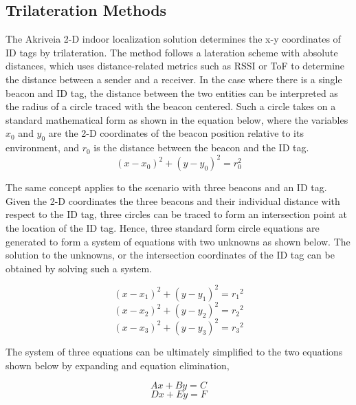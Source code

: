\pagebreak
\subsection{Trilateration Methods}
\medskip
The Akriveia 2-D indoor localization solution determines the x-y coordinates of ID tags by trilateration. The method follows a lateration scheme with absolute distances, which uses distance-related metrics such as RSSI or ToF to determine the distance between a sender and a receiver. In the case where there is a single beacon and ID tag, the distance between the two entities can be interpreted as the radius of a circle traced with the beacon centered. Such a circle takes on a standard mathematical form as shown in the equation below, where the variables $x_0$ and $y_0$ are the 2-D coordinates of the beacon position relative to its environment, and $r_0$ is the distance between the beacon and the ID tag. 
\medskip
\begin{equation*}
	(x-x_{0})^2 + (y-y_{0})^2 = r_{0}^2
\end{equation*}

\medskip
The same concept applies to the scenario with three beacons and an ID tag. Given the 2-D coordinates the three beacons and their individual distance with respect to the ID tag, three circles can be traced to form an intersection point at the location of the ID tag. Hence, three standard form circle equations are generated to form a system of equations with two unknowns as shown below. The solution to the unknowns, or the intersection coordinates of the ID tag can be obtained by solving such a system.


\begin{equation*}
	(x-x_1)^2 + (y-y_1)^2 = {r_1}^2 
\end{equation*}
\begin{equation*}
	(x-x_2)^2 + (y-y_2)^2 = {r_2}^2 
\end{equation*}
\begin{equation*}
	(x-x_3)^2 + (y-y_3)^2 = {r_3}^2  
\end{equation*}

\medskip
The system of three equations can be ultimately simplified to the two equations shown below by expanding and equation elimination,

\begin{equation*}
	Ax + By = C
\end{equation*}
\begin{equation*}
	Dx + Ey = F
\end{equation*}

